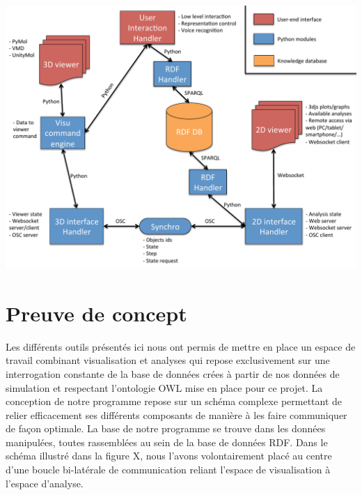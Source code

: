 \includegraphics[width=.75\linewidth]{./figures/visu_ana_semantic_schema.pdf}

\section{Preuve de concept}

Les différents outils présentés ici nous ont permis de mettre en place un espace de travail combinant visualisation et analyses qui repose exclusivement sur une interrogation constante de la base de données crées à partir de nos données de simulation et respectant l'ontologie OWL mise en place pour ce projet.
La conception de notre programme repose sur un schéma complexe permettant de relier efficacement ses différents composants de manière à les faire communiquer de façon optimale. La base de notre programme se trouve dans les données manipulées, toutes rassemblées au sein de la base de données RDF. Dans le schéma illustré dans la figure X, nous l'avons volontairement placé au centre d'une boucle bi-latérale de communication reliant l'espace de visualisation à l'espace d'analyse. 



